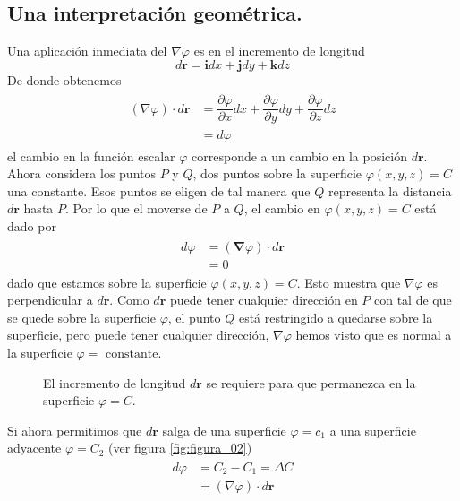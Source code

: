 \subsection*{Una interpretación geométrica.}
Una aplicación inmediata del $\nabla \varphi$ es en el incremento de longitud
\begin{equation}
d \mathbf{r} = \mathbf{i} dx + \mathbf{j} dy + \mathbf{k} dz 
\label{eq:ecuacion_01_55}  
\end{equation}
De donde obtenemos
\begin{eqnarray}
\begin{aligned}
(\nabla \varphi) \cdot d \mathbf{r} &= \dfrac{\partial \varphi}{\partial x} dx + \dfrac{\partial \varphi}{\partial y} dy + \dfrac{\partial \varphi}{\partial z} dz \\
&= d \varphi
\end{aligned}
\label{eq:ecuacion_01_56}
\end{eqnarray}
el cambio en la función escalar $\varphi$ corresponde a un cambio en la posición $d \mathbf{r}$. Ahora considera los puntos $P$ y $Q$, dos puntos sobre la superficie $\varphi(x,y,z)=C$ una constante. Esos puntos se eligen de tal manera que $Q$ representa la distancia $d \mathbf{r}$ hasta $P$. Por lo que el moverse de $P$ a $Q$, el cambio en $\varphi(x,y,z)=C$ está dado por
\begin{eqnarray}
\begin{aligned}
d \varphi &= (\bm{\nabla} \varphi ) \cdot d \mathbf{r} \\
&= 0	
\end{aligned}
\label{eq:ecuacion_01_57}
\end{eqnarray}
dado que estamos sobre la superficie $\varphi(x,y,z)=C$. Esto muestra que $\nabla \varphi$ es perpendicular a $d \mathbf{r}$. Como $d \mathbf{r}$ puede tener cualquier dirección en $P$ con tal de que se quede sobre la superficie $\varphi$, el punto $Q$ está restringido a quedarse sobre la superficie, pero puede tener cualquier dirección, $\nabla \varphi$ hemos visto que es normal a la superficie $\varphi = \mbox{ constante}$.
\begin{figure}[H]
\centering

\label{fig:figura_01}
\caption{El incremento de longitud $d \mathbf{r}$ se requiere para que permanezca en la superficie $\varphi = C$.}
\end{figure}
Si ahora permitimos que $d \mathbf{r}$ salga de una superficie $\varphi = c_{1}$ a una superficie adyacente $\varphi = C_{2}$ (ver figura \ref{fig:figura_02})
\begin{eqnarray}
\begin{aligned}
d \varphi &= C_{2} - C_{1} = \Delta C \\
&= ( \nabla \varphi) \cdot d \mathbf{r}
\label{eq:ecuacion_01_58}
\end{aligned}
\end{eqnarray}
